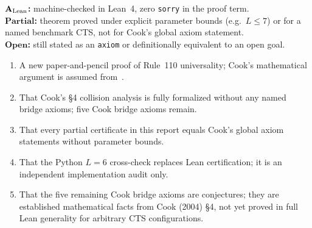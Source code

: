 \documentclass[11pt]{article}
\theoremstyle{remark}
\newcommand{\CatAL}{\ensuremath{\textbf{A}_{\rm Lean}}}
\newcommand{\CatPartial}{\textbf{Partial}}
\newcommand{\CatOpen}{\textbf{Open}}
\begin{document}
\begin{tcolorbox}[colback=gray!4,colframe=gray!50!black,
  title={\textbf{Certification levels}}, fonttitle=\bfseries,
  left=6pt,right=6pt,top=5pt,bottom=5pt]
\small
\textbf{$\CatAL$:} machine-checked in Lean~4, zero \texttt{sorry} in the proof term.\\
\textbf{$\CatPartial$:} theorem proved under explicit parameter bounds (e.g.\ $L \le 7$)
or for a named benchmark CTS, not for Cook's global axiom statement.\\
\textbf{$\CatOpen$:} still stated as an \texttt{axiom} or definitionally equivalent to an open goal.
\end{tcolorbox}

\begin{tcolorbox}[colback=red!3,colframe=red!40!black,
  title={\textbf{What this paper is not claiming}},
  fonttitle=\bfseries,left=6pt,right=6pt,top=5pt,bottom=5pt]
\small
\begin{enumerate}[leftmargin=1.4em,itemsep=0.1em]
\item A new paper-and-pencil proof of Rule~110 universality; Cook's mathematical argument is assumed from~\cite{Cook2004,Cook2009,NearyW06}.
\item That Cook's \S4 collision analysis is fully formalized without any named bridge axioms; five Cook bridge axioms remain.
\item That every partial certificate in this report equals Cook's global axiom statements without parameter bounds.
\item That the Python $L{=}6$ cross-check replaces Lean certification; it is an independent implementation audit only.
\item That the five remaining Cook bridge axioms are conjectures; they are established mathematical facts from Cook (2004) \S4, not yet proved in full Lean generality for arbitrary CTS configurations.
\end{enumerate}
\end{tcolorbox}
\end{document}
